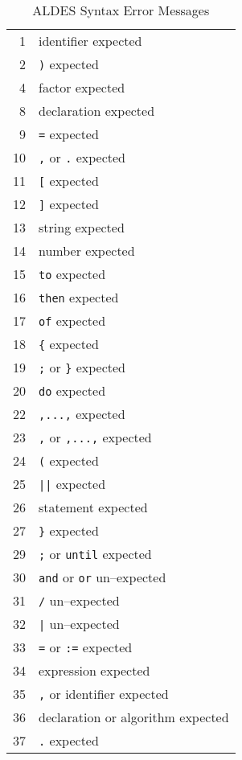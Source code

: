 \begin{table}
\begin{center}
\begin{tabular}{rl}
           1  & identifier expected \\ 
           2  & \verb/)/ expected \\ 
           4  & factor expected \\ 
           8  & declaration expected \\ 
           9  & \verb/=/ expected \\ 
          10  & \verb/,/ or \verb/./ expected \\ 
          11  & \verb/[/ expected \\ 
          12  & \verb/]/ expected \\ 
          13  & string expected \\ 
          14  & number expected \\ 
          15  & \verb/to/ expected \\ 
          16  & \verb/then/ expected \\ 
          17  & \verb/of/ expected \\ 
          18  & \verb/{/ expected \\ 
          19  & \verb/;/ or \verb/}/ expected \\ 
          20  & \verb/do/ expected \\ 
          22  & \verb/,...,/ expected \\ 
          23  & \verb/,/ or \verb/,...,/ expected \\ 
          24  & \verb/(/ expected \\ 
          25  & \verb/||/ expected \\ 
          26  & statement expected \\ 
          27  & \verb/}/ expected \\ 
          29  & \verb/;/ or \verb/until/ expected \\ 
          30  & \verb/and/ or \verb/or/ un--expected \\ 
          31  & \verb./. un--expected \\ 
          32  & \verb/|/ un--expected \\ 
          33  & \verb/=/ or \verb/:=/ expected \\ 
          34  & expression expected \\ 
          35  & \verb/,/ or identifier expected \\ 
          36  & declaration or algorithm expected \\ 
          37  & \verb/./ expected 
\end{tabular}
\end{center}
\label{tabASE}
\caption{ALDES Syntax Error Messages}
\end{table}

